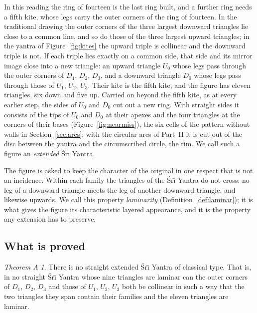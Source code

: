 \documentclass[11pt,a4paper]{article}
\theoremstyle{definition}
\theoremstyle{remark}
\newtheorem*{theoremA}{Theorem A}
\newcommand{\Sri}{\'Sr\={\i}}
\begin{document}
In this reading the ring of fourteen is the last ring built, and a further ring needs a fifth kite,
whose legs carry the outer corners of the ring of fourteen. In the traditional drawing the outer corners
of the three largest downward triangles lie close to a common line, and so do those of the three largest
upward triangles; in the yantra of Figure~\ref{fig:kites} the upward triple is collinear and the
downward triple is not. If each triple lies exactly on a common side, that side and its mirror image close
into a new triangle: an upward triangle $U_0$ whose legs pass through the outer corners of $D_1$, $D_2$,
$D_3$, and a downward triangle $D_0$ whose legs pass through those of $U_1$, $U_2$, $U_3$. Their kite is
the fifth kite, and the figure has eleven triangles, six down and five up. Carried on beyond the fifth
kite, as at every earlier step, the sides of $U_0$ and $D_0$ cut out a new ring. With straight sides it
consists of the tips of $U_0$ and $D_0$ at their apexes and the four triangles at the corners of their
bases (Figure~\ref{fig:nearmiss}), the six cells of the pattern without walls in Section~\ref{sec:arcs};
with the circular arcs of Part~II it is cut out of the disc between the
yantra and the circumscribed circle, the rim. We
call such a figure an \emph{extended} \Sri{} Yantra.

The figure is asked to keep the character of the original in one respect that is not an incidence.
Within each family the triangles of the \Sri{} Yantra do not cross: no leg of a downward triangle meets
the leg of another downward triangle, and likewise upwards. We call this property \emph{laminarity}
(Definition~\ref{def:laminar}); it is what gives the figure its characteristic layered appearance, and it
is the property any extension has to preserve.

\subsection*{What is proved}

\begin{theoremA}
There is no straight extended \Sri{} Yantra of classical type. That is, in no straight \Sri{} Yantra whose
nine triangles are laminar can the outer corners of $D_1$, $D_2$, $D_3$ and those of $U_1$, $U_2$, $U_3$
both be collinear in such a way that the two triangles they span contain their families and the eleven
triangles are laminar.
\end{theoremA}
\end{document}
